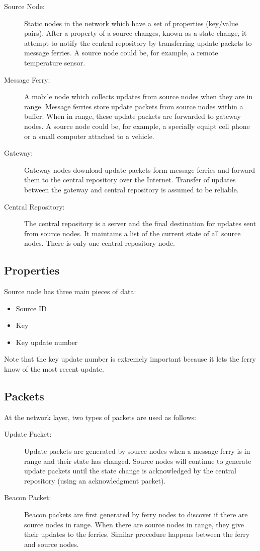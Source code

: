 \begin{description}
\item[Source Node: ] 
Static nodes in the network which have a set of properties (key/value pairs).
After a property of a source changes, known as a state change, it attempt to notify the central repository by transferring update packets to message ferries.
A source node could be, for example, a remote temperature sensor.
\item[Message Ferry: ] 
A mobile node which collects updates from source nodes when they are in range.
Message ferries store update packets from source nodes within a buffer. 
When in range, these update packets are forwarded to gateway nodes.
A source node could be, for example, a specially equipt cell phone or a small computer attached to a vehicle. 
\item[Gateway: ]
Gateway nodes download update packets form message ferries and forward them to the central repository over the Internet.
Transfer of updates between the gateway and central repository is assumed to be reliable. 
\item[Central Repository: ] 
The central repository is a server and the final destination for updates sent from source nodes.
It maintains a list of the current state of all source nodes.
There is only one central repository node.
\end{description}


\subsection{Properties}

Source node has three main pieces of data:
\begin{itemize}
\item Source ID
\item Key
\item Key update number
\end{itemize}

Note that the key update number is extremely important because it lets the ferry know of the most recent update.


\subsection{Packets}

At the network layer, two types of packets are used as follows:

\begin{description}
\item[Update Packet: ]
Update packets are generated by source nodes when a message ferry is in range and their state has changed. 
Source nodes will continue to generate update packets until the state change is acknowledged by the central repository (using an acknowledgment packet).
\item[Beacon Packet: ] 
Beacon packets are first generated by ferry nodes to discover if there are source nodes in range. 
When there are source nodes in range, they give their updates to the ferries. Similar procedure happens between the ferry and source nodes. 
\end{description}

